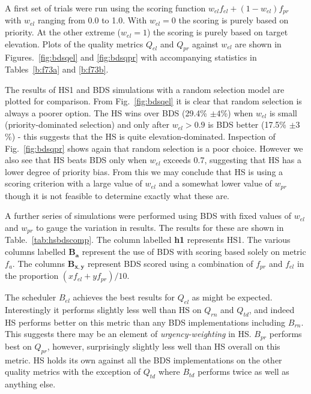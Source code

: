 A first set of trials were run using the scoring function $w_{el}f_{el}+(1-w_{el})f_{pr}$ with $w_{el}$ ranging from 0.0 to 1.0. With $w_{el}=0$ the scoring is purely based on priority. At the other extreme ($w_{el}=1$) the scoring is purely based on target elevation. Plots of the quality metrics $Q_{el}$ and $Q_{pr}$ against $w_{el}$ are shown in Figures.~\ref{fig:bdsqel} and \ref{fig:bdsqpr} with accompanying statistics in Tables~\ref{b:f73a} and \ref{b:f73b}. 

The results of HS1 and BDS simulations with a random selection model are plotted for comparison. From Fig.~\ref{fig:bdsqel} it is clear that random selection is always a poorer option. The HS wins over BDS (29.4\% $\pm 4$\%) when $w_{el}$ is small (priority-dominated selection) and only after $w_{el}>0.9$ is BDS better (17.5\% $\pm 3$\%) - this suggests that the HS is quite elevation-dominated. Inspection of Fig.~\ref{fig:bdsqpr} shows again that random selection is a poor choice. However we also see that HS beats BDS only when $w_{el}$ exceeds 0.7, suggesting that HS has a lower degree of priority bias. From this we may conclude that HS is using a scoring criterion with a large value of $w_{el}$ and a somewhat lower value of $w_{pr}$ though it is not feasible to determine exactly what these are.

A further series of simulations were performed using BDS with fixed values of $w_{el}$ and $w_{pr}$ to gauge the variation in results. The results for these are shown in Table.~\ref{tab:hsbdscomp}. The column labelled {\bf h1} represents HS1. The various columns labelled $\mathbf{B_a}$ represent the use of BDS with scoring based solely on metric $f_a$. The columns $\mathbf{B_{x,y}}$ represent BDS scored using a combination of $f_{pr}$ and $f_{el}$ in the proportion $(xf_{el}+yf_{pr})/10$. 

The scheduler $B_{el}$ achieves the best results for $Q_{el}$ as might be expected. Interestingly it performs slightly less well than HS on $Q_{rn}$ and $Q_{td}$, and indeed HS performs better on this metric than any BDS implementations including $B_{rn}$. This suggests there may be an element of \emph{urgency-weighting} in HS. $B_{pr}$ performs best on $Q_{pr}$, however, surprisingly slightly less well than HS overall on this metric. HS holds its own against all the BDS implementations on the other quality metrics with the exception of $Q_{td}$ where $B_{td}$ performs twice as well as anything else. 

